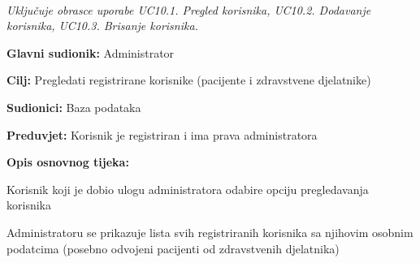 					\noindent {}\\
					\textit{Uključuje obrasce uporabe UC10.1. Pregled korisnika, UC10.2. Dodavanje korisnika, UC10.3. Brisanje korisnika.}\\
					
					\noindent {}
					\begin{packed_item}
						
						\item \textbf{Glavni sudionik: }Administrator
						\item  \textbf{Cilj:} Pregledati registrirane korisnike (pacijente i zdravstvene djelatnike)
						\item  \textbf{Sudionici:} Baza podataka
						\item  \textbf{Preduvjet:} Korisnik je registriran i ima prava administratora
						\item  \textbf{Opis osnovnog tijeka:}
						
						\item[] \begin{packed_enum}
							
							\item Korisnik koji je dobio ulogu administratora odabire opciju pregledavanja korisnika
							\item Administratoru se prikazuje lista svih registriranih korisnika sa njihovim osobnim podatcima (posebno odvojeni pacijenti od zdravstvenih djelatnika)
						\end{packed_enum}
						
					\end{packed_item}
					
